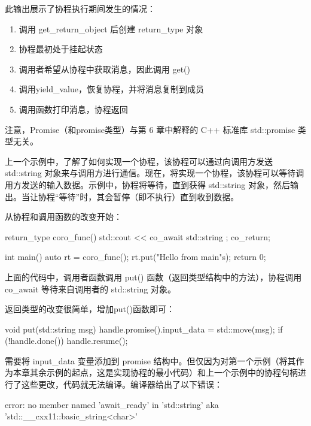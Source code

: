 此输出展示了协程执行期间发生的情况：

\begin{enumerate}
\item
调用 get\_return\_object 后创建 return\_type 对象

\item
协程最初处于挂起状态

\item
调用者希望从协程中获取消息，因此调用 get()

\item
调用yield\_value，恢复协程，并将消息复制到成员

\item
调用函数打印消息，协程返回
\end{enumerate}

注意，Promise（和promise类型）与第 6 章中解释的 C++ 标准库 std::promise 类型无关。


上一个示例中，了解了如何实现一个协程，该协程可以通过向调用方发送 std::string 对象来与调用方进行通信。现在，将实现一个协程，该协程可以等待调用方发送的输入数据。示例中，协程将等待，直到获得 std::string 对象，然后输出。当让协程“等待”时，其会暂停（即不执行）直到收到数据。

从协程和调用函数的改变开始：

\begin{cpp}
return_type coro_func() {
    std::cout << co_await std::string{ };
    co_return;
}

int main() {
    auto rt = coro_func();
    rt.put("Hello from main\n"s);
    return 0;
}
\end{cpp}

上面的代码中，调用者函数调用 put() 函数（返回类型结构中的方法），协程调用 co\_await 等待来自调用者的 std::string 对象。

返回类型的改变很简单，增加put()函数即可：

\begin{cpp}
void put(std::string msg) {
    handle.promise().input_data = std::move(msg);
    if (!handle.done()) {
        handle.resume();
    }
}
\end{cpp}

需要将 input\_data 变量添加到 promise 结构中。但仅因为对第一个示例（将其作为本章其余示例的起点，这是实现协程的最小代码）和上一个示例中的协程句柄进行了这些更改，代码就无法编译。编译器给出了以下错误：

\begin{shell}
error: no member named 'await_ready' in 'std::string' {aka 'std::__cxx11::basic_string<char>'}
\end{shell}

